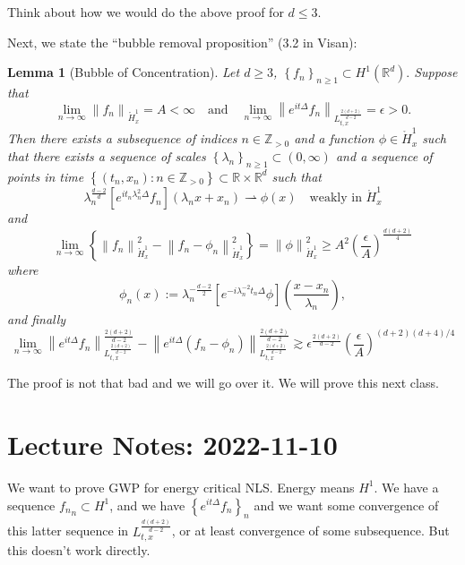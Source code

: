 \documentclass{article}
\newtheorem{lemma}{Lemma}
\def\R{\mathbb{R}} %
\def\Z{\mathbb{Z}} %
\newcommand\norm[1]{\left\lVert#1\right\rVert}
\begin{document}
Think about how we would do the above proof for $d \leq 3$.

Next, we state the ``bubble removal proposition'' (3.2 in Visan):

\begin{lemma}[Bubble of Concentration]
  \label{lem:bubble-concentration}
  Let $d \geq 3$,  $\left\{f_{n}\right\}_{n\geq1}\subset H^{1}(\R^d).$ Suppose
  that
  \begin{equation*}
    \lim_{n\to\infty} \norm{f_{n}}_{\mathring{H}_{x}^{1}} = A< \infty
    \quad \text{and} \quad
    \lim_{n\to\infty} \norm{e^{it\Delta}f_{n}}_{L_{t,x}^{\frac{2(d+2)}{d-2}}}=\epsilon>0.
  \end{equation*}
  Then there exists a subsequence of indices $n\in \Z_{>0}$ and a function
  $\phi\in \mathring{H}^{1}_{x}$ such that there exists a sequence of scales
  $\left\{\lambda_{n}\right\}_{n \geq 1}\subset (0,\infty)$ and a sequence of
  points in time $ \left\{(t_{n},x_{n}):n\in \Z_{>0}\right\}\subset \R\times \R^{d}$ such that
  \begin{equation*}
    \lambda_{n}^{\frac{d-2}{d}}\left[ e^{it_{n}\lambda_{n}^{2}\Delta}f_{n}
    \right](\lambda_{n}x+x_{n})\rightharpoonup \phi(x) \quad \text{weakly
      in }\mathring{H}^{1}_{x}
  \end{equation*}
  and
  \begin{equation*}
    \lim_{n\to\infty} \left\{\norm{f_{n}}_{\mathring{H}^{1}_{x}}^{2}-
      \norm{f_{n}-\phi_{n}}_{\mathring{H}_{x}^{1}}^{2}\right\} =
    \norm{\phi}_{\mathring{H}^{1}_{x}}^{2} \geq A^{2}\left( \frac{\epsilon}{A}
    \right)^{\frac{d(d+2)}{4}} 
  \end{equation*}
  where
  \begin{equation*}
    \phi_{n}(x) := \lambda_{n}^{-\frac{d-2}{2}} \left[ e^{-i\lambda_{n}^{-2}t_{n}\Delta}\phi \right]\left( \frac{x-x_{n}}{\lambda_{n}} \right),
  \end{equation*}
  and finally
  \begin{equation*}
    \lim_{n\to\infty}  \norm{e^{it\Delta}f_{n}}_{L_{t,x}^{\frac{2(d+2)}{d-2}}}^{\frac{2(d+2)}{d-2}} - \norm{e^{it\Delta}\left( f_{n}-\phi_{n} \right) }_{L_{t,x}^{\frac{2(d+2)}{d-2}}}^{\frac{2(d+2)}{d-2}} \gtrsim \epsilon^{\frac{2(d+2)}{d-2}} \left( \frac{\epsilon}{A} \right)^{(d+2)(d+4)/4} 
  \end{equation*}
\end{lemma}
The proof is not that bad and we will go over it. We will prove this next class.
\section{Lecture Notes: 2022-11-10}
We want to prove GWP for energy critical NLS. Energy means $H^{1}$. We have a
sequence ${f_{n}}_{n}\subset H^{1}$, and we have
$\left\{e^{it\Delta}f_{n}\right\}_{n}$ and we want some convergence of this
latter sequence in $L_{t,x}^{\frac{d(d+2)}{d-2}}$, or at least convergence of
some subsequence. But this doesn't work directly.
\end{document}
